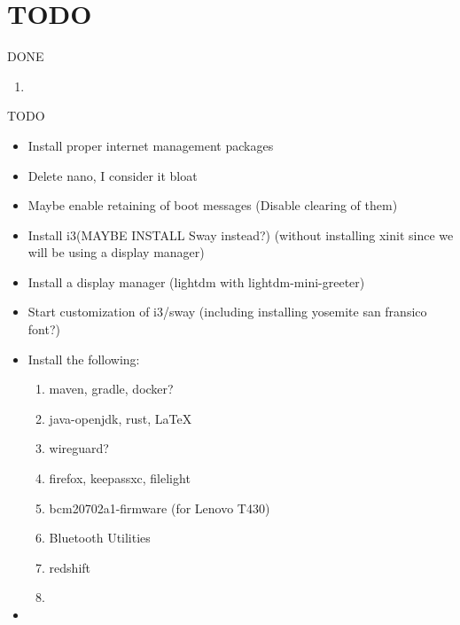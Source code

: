 
\section{TODO}
DONE
\begin{enumerate}
    \item 
\end{enumerate}

TODO
\begin{itemize}
    \item Install proper internet management packages
    \item Delete nano, I consider it bloat
    \item Maybe enable retaining of boot messages (Disable clearing of them)
    \item Install i3(MAYBE INSTALL Sway instead?) (without installing xinit since we will be using a display manager)
    \item Install a display manager (lightdm with lightdm-mini-greeter)
    \item Start customization of i3/sway (including installing yosemite san fransico font?)
    \item Install the following:
    \begin{enumerate}
        \item maven, gradle, docker?
        \item java-openjdk, rust, \LaTeX
        \item wireguard?
        \item firefox, keepassxc, filelight
        \item bcm20702a1-firmware (for Lenovo T430)
        \item Bluetooth Utilities
        \item redshift
        \item 
    \end{enumerate}
    \item 
\end{itemize}